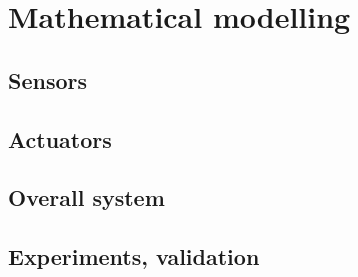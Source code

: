 \section{Mathematical modelling}
	
		\subsection{Sensors}
		
		\subsection{Actuators}
		
		\subsection{Overall system}
		
		\subsection{Experiments, validation}
